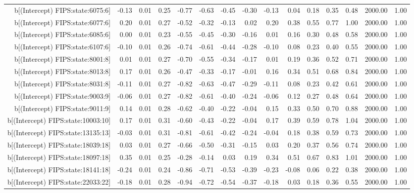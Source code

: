 \begin{table}[ht]
\begin{tabular}{rrrrrrrrrrrrrrr}
  b[(Intercept) FIPS:state:6075:6] & -0.13 & 0.01 & 0.25 & -0.77 & -0.63 & -0.45 & -0.30 & -0.13 & 0.04 & 0.18 & 0.35 & 0.48 & 2000.00 & 1.00 \\ 
  b[(Intercept) FIPS:state:6077:6] & 0.20 & 0.01 & 0.27 & -0.52 & -0.32 & -0.13 & 0.02 & 0.20 & 0.38 & 0.55 & 0.77 & 1.00 & 2000.00 & 1.00 \\ 
  b[(Intercept) FIPS:state:6085:6] & 0.00 & 0.01 & 0.23 & -0.55 & -0.45 & -0.30 & -0.16 & 0.01 & 0.16 & 0.30 & 0.48 & 0.58 & 2000.00 & 1.00 \\ 
  b[(Intercept) FIPS:state:6107:6] & -0.10 & 0.01 & 0.26 & -0.74 & -0.61 & -0.44 & -0.28 & -0.10 & 0.08 & 0.23 & 0.40 & 0.55 & 2000.00 & 1.00 \\ 
  b[(Intercept) FIPS:state:8001:8] & 0.01 & 0.01 & 0.27 & -0.70 & -0.55 & -0.34 & -0.17 & 0.01 & 0.19 & 0.36 & 0.52 & 0.71 & 2000.00 & 1.00 \\ 
  b[(Intercept) FIPS:state:8013:8] & 0.17 & 0.01 & 0.26 & -0.47 & -0.33 & -0.17 & -0.01 & 0.16 & 0.34 & 0.51 & 0.68 & 0.84 & 2000.00 & 1.00 \\ 
  b[(Intercept) FIPS:state:8031:8] & -0.11 & 0.01 & 0.27 & -0.82 & -0.63 & -0.47 & -0.29 & -0.11 & 0.08 & 0.23 & 0.42 & 0.61 & 2000.00 & 1.00 \\ 
  b[(Intercept) FIPS:state:9003:9] & -0.06 & 0.01 & 0.27 & -0.82 & -0.61 & -0.40 & -0.24 & -0.06 & 0.12 & 0.27 & 0.48 & 0.64 & 2000.00 & 1.00 \\ 
  b[(Intercept) FIPS:state:9011:9] & 0.14 & 0.01 & 0.28 & -0.62 & -0.40 & -0.22 & -0.04 & 0.15 & 0.33 & 0.50 & 0.70 & 0.88 & 2000.00 & 1.00 \\ 
  b[(Intercept) FIPS:state:10003:10] & 0.17 & 0.01 & 0.31 & -0.60 & -0.43 & -0.22 & -0.04 & 0.17 & 0.39 & 0.59 & 0.78 & 1.04 & 2000.00 & 1.00 \\ 
  b[(Intercept) FIPS:state:13135:13] & -0.03 & 0.01 & 0.31 & -0.81 & -0.61 & -0.42 & -0.24 & -0.04 & 0.18 & 0.38 & 0.59 & 0.73 & 2000.00 & 1.00 \\ 
  b[(Intercept) FIPS:state:18039:18] & 0.03 & 0.01 & 0.27 & -0.66 & -0.50 & -0.31 & -0.15 & 0.03 & 0.20 & 0.37 & 0.56 & 0.74 & 2000.00 & 1.00 \\ 
  b[(Intercept) FIPS:state:18097:18] & 0.35 & 0.01 & 0.25 & -0.28 & -0.14 & 0.03 & 0.19 & 0.34 & 0.51 & 0.67 & 0.83 & 1.01 & 2000.00 & 1.00 \\ 
  b[(Intercept) FIPS:state:18141:18] & -0.24 & 0.01 & 0.24 & -0.86 & -0.71 & -0.53 & -0.39 & -0.23 & -0.08 & 0.06 & 0.22 & 0.38 & 2000.00 & 1.00 \\ 
  b[(Intercept) FIPS:state:22033:22] & -0.18 & 0.01 & 0.28 & -0.94 & -0.72 & -0.54 & -0.37 & -0.18 & 0.03 & 0.18 & 0.36 & 0.55 & 2000.00 & 1.00 \\ 

\end{tabular}
\end{table}
